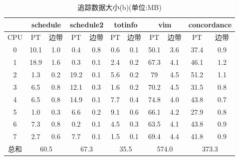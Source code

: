   \begin{table}[]
    \centering
    \caption{追踪数据大小(b)(单位:MB)}
    \label{tab:11}
    \begin{tabular}{c|c|c|c|c|c|c|c|c|c|c}
    \hline
    &
    \multicolumn{2}{c|}{schedule} & \multicolumn{2}{c|}{schedule2} & \multicolumn{2}{c|}{totinfo} & \multicolumn{2}{c|}{vim} & \multicolumn{2}{c}{concordance}\\ \hline
    CPU      & PT          & 边带        & PT           & 边带        & PT        & 边带      & PT         & 边带        & PT        & 边带     \\ \hline
    0 & 10.1        & 1.0             & 0.4          & 0.8           & 0.6        & 0.1             & 50.1      & 3.6          & 37.4        & 0.9            \\ \hline
    1 & 18.9        & 1.6             & 0.3          & 0.1           & 2.4        & 0.2             & 67.3      & 4.1          & 46.1        & 1.2            \\ \hline
    2 & 1.3         & 0.2             & 19.2         & 0.1           & 5.6        & 0.2             & 79        & 4.5          & 51.2        & 1.1             \\ \hline
    3 & 6.5         & 0.8             & 12.1         & 0.3           & 1.6        & 0.2             & 70.2      & 4.5          & 31.5        & 0.8             \\ \hline
    4 & 6.5         & 0.8             & 14.9         & 0.1           & 7.7        & 0.4             & 74.8      & 4.0          & 43.8        & 0.7             \\ \hline
    5 & 1.0         & 0.3             & 6.6          & 0.2           & 9.1        & 0.6             & 66.1      & 4.2          & 27.9        & 0.8             \\ \hline
    6 & 7.3         & 0.8             & 0.2          & 0.1           & 4.5        & 0.3             & 63.5      & 4.1          & 43.8        & 0.9             \\ \hline
    7 & 2.7         & 0.6             & 7.7          & 0.1           & 1.5        & 0.1             & 69.4      & 4.4          & 41.8        & 0.9              \\ \hline
    总和& \multicolumn{2}{c|}{60.5}& \multicolumn{2}{c|}{67.3}& \multicolumn{2}{c|}{35.5}& \multicolumn{2}{c|}{574.0}& \multicolumn{2}{c}{373.3} \\ \hline 
    \end{tabular}
    \end{table}

